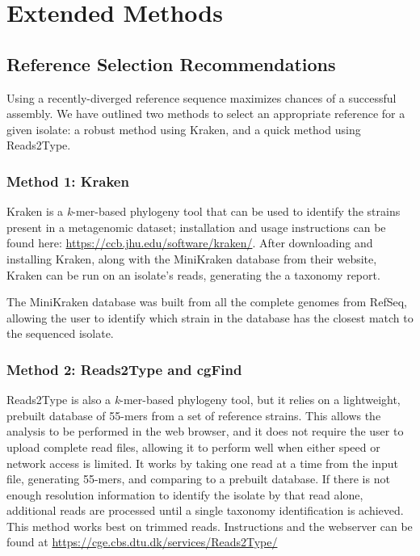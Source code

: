 \section*{Extended Methods}

\subsection*{Reference Selection Recommendations}
Using a recently-diverged reference sequence maximizes chances of a successful assembly. We have outlined two methods to select an appropriate reference for a given isolate: a robust method using Kraken, and a quick method using Reads2Type.

\subsubsection*{Method 1: Kraken}

Kraken \cite{Wood2014} is a \textit{k}-mer-based phylogeny tool that can be used to identify the strains present in a metagenomic dataset; installation and usage instructions can be found here: \href{https://ccb.jhu.edu/software/kraken/}{https://ccb.jhu.edu/software/kraken/}. After downloading and installing Kraken, along with the MiniKraken database from their website, Kraken can be run on an isolate's reads, generating the a taxonomy report.

The MiniKraken database was built from all the complete genomes from RefSeq, allowing the user to identify which strain in the database has the closest match to the sequenced isolate.

\subsubsection*{Method 2: Reads2Type and  cgFind}
Reads2Type \cite{Saputra2015} is also a \textit{k}-mer-based phylogeny tool, but it relies on a lightweight, prebuilt database of 55-mers from a set of reference strains. This allows the analysis to be performed in the web browser, and it does not require the user to upload complete read files, allowing it to perform well when either speed or network access is limited.  It works by taking one read at a time from the input file, generating 55-mers, and comparing to a prebuilt database. If there is not enough resolution information to identify the isolate by that read alone, additional reads are processed until a single taxonomy identification is achieved.  This method works best on trimmed reads. Instructions and the webserver can be found at \href{https://cge.cbs.dtu.dk/services/Reads2Type/}{https://cge.cbs.dtu.dk/services/Reads2Type/}

